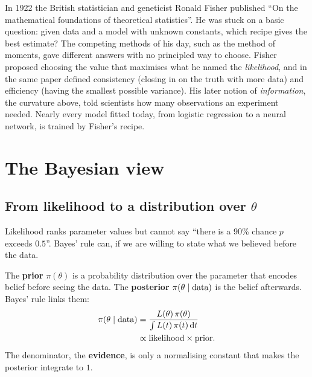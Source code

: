 \begin{historybox}
In 1922 the British statistician and geneticist Ronald Fisher published ``On the
mathematical foundations of theoretical statistics''. He was stuck on a basic question:
given data and a model with unknown constants, which recipe gives the best estimate? The
competing methods of his day, such as the method of moments, gave different answers with
no principled way to choose. Fisher proposed choosing the value that maximises what he
named the \emph{likelihood}, and in the same paper defined consistency (closing in on
the truth with more data) and efficiency (having the smallest possible variance). His
later notion of \emph{information}, the curvature above, told scientists how many
observations an experiment needed. Nearly every model fitted today, from logistic
regression to a neural network, is trained by Fisher's recipe.
\end{historybox}

\section{The Bayesian view}
\label{sec:lik-bayes}

\subsection{From likelihood to a distribution over $\theta$}

Likelihood ranks parameter values but cannot say ``there is a 90\% chance $p$ exceeds
$0.5$''. Bayes' rule can, if we are willing to state what we believed before the data.

\begin{definition}
The \textbf{prior} $\pi(\theta)$ is a probability distribution over the parameter that
encodes belief before seeing the data. The \textbf{posterior} $\pi(\theta\mid\text{data})$
is the belief afterwards. Bayes' rule links them:
\begin{align*}
  \pi(\theta\mid\text{data}) &= \frac{L(\theta)\,\pi(\theta)}{\int L(t)\,\pi(t)\,\mathrm{d} t} \\
  &\propto \text{likelihood} \times \text{prior} .
\end{align*}
The denominator, the \textbf{evidence}, is only a normalising constant that makes the
posterior integrate to $1$.
\end{definition}

